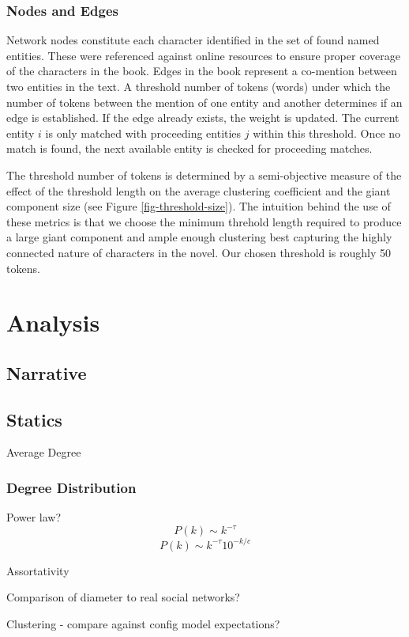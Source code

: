 \documentclass[12pt]{article}
\begin{document}
\subsubsection*{Nodes and Edges}
Network nodes constitute each character identified in the set of found named entities. These were referenced against online resources to ensure proper coverage of the characters in the book. Edges in the book represent a co-mention between two entities in the text. A threshold number of tokens (words) under which the number of tokens between the mention of one entity and another determines if an edge is established. If the edge already exists, the weight is updated. The current entity $i$ is only matched with proceeding entities $j$ within this threshold. Once no match is found, the next available entity is checked for proceeding matches.

The threshold number of tokens is determined by a semi-objective measure of the effect of the threshold length on the average clustering coefficient and the giant component size (see Figure \ref{fig-threshold-size}). The intuition behind the use of these metrics is that we choose the minimum threhold length required to produce a large giant component and ample enough clustering best capturing the highly connected nature of characters in the novel.  Our chosen threshold is roughly 50 tokens.

\section*{Analysis}

\subsection*{Narrative}

\subsection*{Statics}
Average Degree

\subsubsection{Degree Distribution}
Power law? 
$$P(k) \sim k^{-\tau}$$
$$P(k) \sim k^{-\tau}10^{-k/c}$$

Assortativity

Comparison of diameter to real social networks?

Clustering
 - compare against config model expectations?
\end{document}
